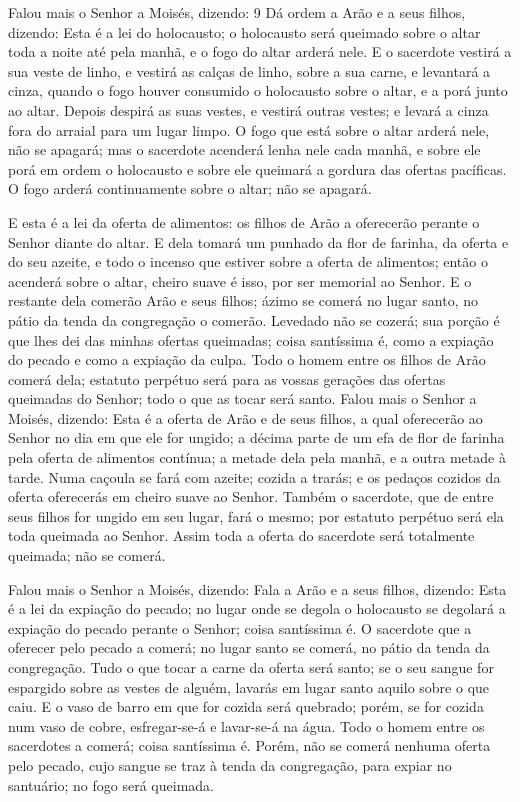 Falou mais o Senhor a Moisés, dizendo: 9 Dá ordem a Arão e a seus
filhos, dizendo: Esta é a lei do holocausto; o holocausto será
queimado sobre o altar toda a noite até pela manhã, e o fogo do
altar arderá nele. E o sacerdote vestirá a sua veste de
linho, e vestirá as calças de linho, sobre a sua carne, e levantará
a cinza, quando o fogo houver consumido o holocausto sobre o altar,
e a porá junto ao altar. Depois despirá as suas vestes, e
vestirá outras vestes; e levará a cinza fora do arraial para um
lugar limpo. O fogo que está sobre o altar arderá nele, não
se apagará; mas o sacerdote acenderá lenha nele cada manhã, e sobre
ele porá em ordem o holocausto e sobre ele queimará a gordura das
ofertas pacíficas. O fogo arderá continuamente sobre o altar;
não se apagará.

E esta é a lei da oferta de alimentos: os filhos de Arão a
oferecerão perante o Senhor diante do altar. E dela tomará um
punhado da flor de farinha, da oferta e do seu azeite, e todo o
incenso que estiver sobre a oferta de alimentos; então o acenderá
sobre o altar, cheiro suave é isso, por ser memorial ao Senhor.
E o restante dela comerão Arão e seus filhos; ázimo se comerá
no lugar santo, no pátio da tenda da congregação o comerão.
Levedado não se cozerá; sua porção é que lhes dei das minhas
ofertas queimadas; coisa santíssima é, como a expiação do pecado e
como a expiação da culpa. Todo o homem entre os filhos de
Arão comerá dela; estatuto perpétuo será para as vossas gerações das
ofertas queimadas do Senhor; todo o que as tocar será santo.
Falou mais o Senhor a Moisés, dizendo: Esta é a oferta
de Arão e de seus filhos, a qual oferecerão ao Senhor no dia em que
ele for ungido; a décima parte de um efa de flor de farinha pela
oferta de alimentos contínua; a metade dela pela manhã, e a outra
metade à tarde. Numa caçoula se fará com azeite; cozida a
trarás; e os pedaços cozidos da oferta oferecerás em cheiro suave ao
Senhor. Também o sacerdote, que de entre seus filhos for
ungido em seu lugar, fará o mesmo; por estatuto perpétuo será ela
toda queimada ao Senhor. Assim toda a oferta do sacerdote
será totalmente queimada; não se comerá.

Falou mais o Senhor a Moisés, dizendo: Fala a Arão e a
seus filhos, dizendo: Esta é a lei da expiação do pecado; no lugar
onde se degola o holocausto se degolará a expiação do pecado perante
o Senhor; coisa santíssima é. O sacerdote que a oferecer pelo
pecado a comerá; no lugar santo se comerá, no pátio da tenda da
congregação. Tudo o que tocar a carne da oferta será santo;
se o seu sangue for espargido sobre as vestes de alguém, lavarás em
lugar santo aquilo sobre o que caiu. E o vaso de barro em que
for cozida será quebrado; porém, se for cozida num vaso de cobre,
esfregar-se-á e lavar-se-á na água. Todo o homem entre os
sacerdotes a comerá; coisa santíssima é. Porém, não se comerá
nenhuma oferta pelo pecado, cujo sangue se traz à tenda da
congregação, para expiar no santuário; no fogo será queimada.

